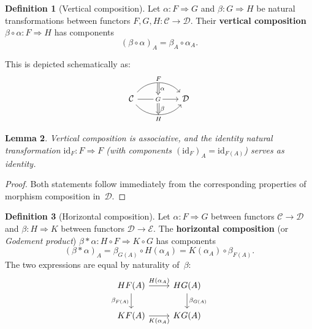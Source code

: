 \documentclass[a4paper,12pt]{book}
\newcommand{\id}{\mathrm{id}}
\theoremstyle{definition}
\newtheorem{definition}{Definition}[section]
\theoremstyle{plain}
\newtheorem{lemma}[definition]{Lemma}
\theoremstyle{remark}
\begin{document}
\begin{definition}[Vertical composition]\label{def:vert-comp}
Let $\alpha\colon F\Rightarrow G$ and $\beta\colon G\Rightarrow H$ be
natural transformations between functors
$F,G,H\colon\mathcal{C}\to\mathcal{D}$.
Their \textbf{vertical composition}
$\beta\circ\alpha\colon F\Rightarrow H$ has components
\[
    (\beta\circ\alpha)_A = \beta_A\circ\alpha_A.
\]
\end{definition}

This is depicted schematically as:
\[
\begin{tikzcd}[column sep=huge]
    \mathcal{C}
    \arrow[r, bend left=50, "F"{name=F}]
    \arrow[r, "G"{name=G, description}]
    \arrow[r, bend right=50, "H"{name=H, below}]
    &
    \mathcal{D}
    \arrow[Rightarrow, from=F, to=G, "\alpha"]
    \arrow[Rightarrow, from=G, to=H, "\beta"]
\end{tikzcd}
\]

\begin{lemma}\label{lem:vert-comp-nat}
Vertical composition is associative, and the identity natural
transformation $\id_F\colon F\Rightarrow F$ (with components
$(\id_F)_A = \id_{F(A)}$) serves as identity.
\end{lemma}

\begin{proof}
Both statements follow immediately from the corresponding properties
of morphism composition in~$\mathcal{D}$.
\end{proof}

\begin{definition}[Horizontal composition]\label{def:horiz-comp}
Let $\alpha\colon F\Rightarrow G$ between functors
$\mathcal{C}\to\mathcal{D}$ and
$\beta\colon H\Rightarrow K$ between functors
$\mathcal{D}\to\mathcal{E}$.
The \textbf{horizontal composition} (or \emph{Godement product})
$\beta*\alpha\colon H\circ F\Rightarrow K\circ G$ has components
\[
    (\beta*\alpha)_A = \beta_{G(A)}\circ H(\alpha_A)
                     = K(\alpha_A)\circ\beta_{F(A)}.
\]
The two expressions are equal by naturality of~$\beta$:
\[
\begin{tikzcd}
    HF(A) \arrow[r, "H(\alpha_A)"] \arrow[d, "\beta_{F(A)}"'] &
    HG(A) \arrow[d, "\beta_{G(A)}"] \\
    KF(A) \arrow[r, "K(\alpha_A)"'] &
    KG(A)
\end{tikzcd}
\]
\end{definition}
\end{document}
